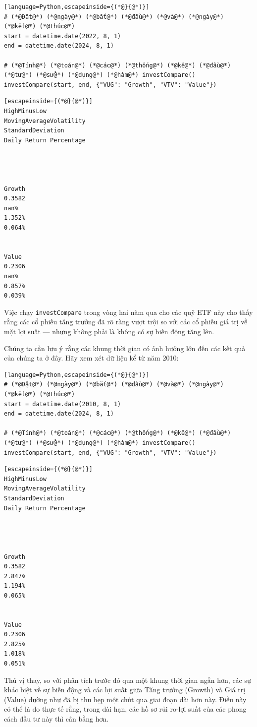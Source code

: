 \begin{lstlisting}[language=Python,escapeinside={(*@}{@*)}]
# (*@Đặt@*) (*@ngày@*) (*@bắt@*) (*@đầu@*) (*@và@*) (*@ngày@*) (*@kết@*) (*@thúc@*)
start = datetime.date(2022, 8, 1)
end = datetime.date(2024, 8, 1)

# (*@Tính@*) (*@toán@*) (*@các@*) (*@thống@*) (*@kê@*) (*@đầu@*) (*@tư@*) (*@sử@*) (*@dụng@*) (*@hàm@*) investCompare()
investCompare(start, end, {"VUG": "Growth", "VTV": "Value"})
\end{lstlisting}

\begin{lstlisting}[escapeinside={(*@}{@*)}]
HighMinusLow
MovingAverageVolatility
StandardDeviation
Daily Return Percentage




Growth
0.3582
nan%
1.352%
0.064%


Value
0.2306
nan%
0.857%
0.039%
\end{lstlisting}

Việc chạy \texttt{investCompare} trong vòng hai năm qua cho các quỹ ETF này cho thấy rằng các cổ phiếu tăng trưởng đã rõ ràng vượt trội so với các cổ phiếu giá trị về mặt lợi suất --- nhưng không phải là không có sự biến động tăng lên.

Chúng ta cần lưu ý rằng các khung thời gian có ảnh hưởng lớn đến các kết quả của chúng ta ở đây. Hãy xem xét dữ liệu kể từ năm 2010:

\begin{lstlisting}[language=Python,escapeinside={(*@}{@*)}]
# (*@Đặt@*) (*@ngày@*) (*@bắt@*) (*@đầu@*) (*@và@*) (*@ngày@*) (*@kết@*) (*@thúc@*)
start = datetime.date(2010, 8, 1)
end = datetime.date(2024, 8, 1)

# (*@Tính@*) (*@toán@*) (*@các@*) (*@thống@*) (*@kê@*) (*@đầu@*) (*@tư@*) (*@sử@*) (*@dụng@*) (*@hàm@*) investCompare()
investCompare(start, end, {"VUG": "Growth", "VTV": "Value"})
\end{lstlisting}

\begin{lstlisting}[escapeinside={(*@}{@*)}]
HighMinusLow
MovingAverageVolatility
StandardDeviation
Daily Return Percentage




Growth
0.3582
2.847%
1.194%
0.065%


Value
0.2306
2.825%
1.018%
0.051%
\end{lstlisting}

Thú vị thay, so với phân tích trước đó qua một khung thời gian ngắn hơn, các sự khác biệt về sự biến động và các lợi suất giữa Tăng trưởng (Growth) và Giá trị (Value) dường như đã bị thu hẹp một chút qua giai đoạn dài hơn này. Điều này có thể là do thực tế rằng, trong dài hạn, các hồ sơ rủi ro-lợi suất của các phong cách đầu tư này thì cân bằng hơn.

